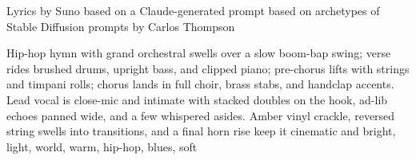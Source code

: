 
\begin{notes}
Lyrics by Suno based on a Claude-generated prompt based on archetypes of Stable Diffusion prompts by Carlos Thompson
\end{notes}
\begin{style}
Hip-hop hymn with grand orchestral swells over a slow boom-bap swing; verse rides brushed drums, upright bass, and clipped piano; pre-chorus lifts with strings and timpani rolls; chorus lands in full choir, brass stabs, and handclap accents. Lead vocal is close-mic and intimate with stacked doubles on the hook, ad-lib echoes panned wide, and a few whispered asides. Amber vinyl crackle, reversed string swells into transitions, and a final horn rise keep it cinematic and bright, light, world, warm, hip-hop, blues, soft
\end{style}
